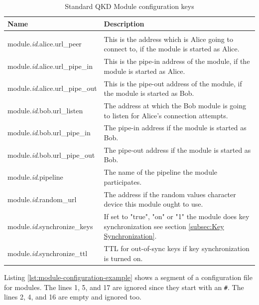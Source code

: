 \medskip

\begin{table}[h]
    \begin{tabular}{lp{8cm}}
    Name                                    &   Description \\
    \hline
    \\
    module.\emph{id}.alice.url\_peer        &   This is the address which is Alice going to connect to, if the module is started as Alice. \\[0.7em]
    module.\emph{id}.alice.url\_pipe\_in    &   This is the pipe-in address of the module, if the module is started as Alice. \\[0.7em]
    module.\emph{id}.alice.url\_pipe\_out   &   This is the pipe-out address of the module, if the module is started as Bob. \\[0.7em]
    module.\emph{id}.bob.url\_listen        &   The address at which the Bob module is going to listen for Alice's connection attempts. \\[0.7em]
    module.\emph{id}.bob.url\_pipe\_in      &   The pipe-in address if the module is started as Bob. \\[0.7em]
    module.\emph{id}.bob.url\_pipe\_out     &   The pipe-out address if the module is started as Bob. \\[0.7em]
    module.\emph{id}.pipeline               &   The name of the pipeline the module participates. \\[0.7em]
    module.\emph{id}.random\_url            &   The address if the random values character device this module ought to use. \\[0.7em]
    module.\emph{id}.synchronize\_keys      &   If set to "true", "on" or "1" the module does key synchronization see section \ref{subsec:Key Synchronization}. \\[0.7em]
    module.\emph{id}.synchronize\_ttl        &   TTL for out-of-sync keys if key synchronization is turned on. \\[0.7em]
    \end{tabular}
    \caption{Standard QKD Module configuration keys}
    \label{tab:Standard QKD Module configuration keys}
\end{table}

\medskip

\clearpage

Listing \ref{lst:module-configuration-example} shows a segment of a configuration file for modules. The lines 1, 5, and 17 are ignored since they start with an \texttt{\#}. The lines 2, 4, and 16 are empty and ignored too.

